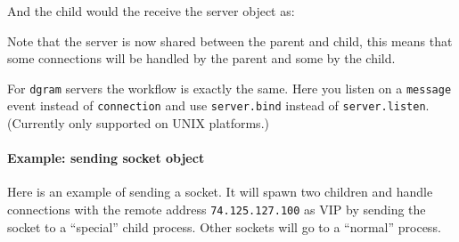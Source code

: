 And the child would the receive the server object as:

\begin{Shaded}
\begin{Highlighting}[]
\NormalTok{(}\NormalTok{, }
   \NormalTok{) \{}
    \NormalTok{(}\NormalTok{, } 
      \NormalTok{(}\NormalTok{);}
    \NormalTok{\});}
  \NormalTok{\}}
\NormalTok{\});}
\end{Highlighting}
\end{Shaded}

Note that the server is now shared between the parent and child, this
means that some connections will be handled by the parent and some by
the child.

For \texttt{dgram} servers the workflow is exactly the same. Here you
listen on a \texttt{message} event instead of \texttt{connection} and
use \texttt{server.bind} instead of \texttt{server.listen}. (Currently
only supported on UNIX platforms.)

\paragraph{Example: sending socket
object}\label{example-sending-socket-object}

Here is an example of sending a socket. It will spawn two children and
handle connections with the remote address \texttt{74.125.127.100} as
VIP by sending the socket to a ``special'' child process. Other sockets
will go to a ``normal'' process.

